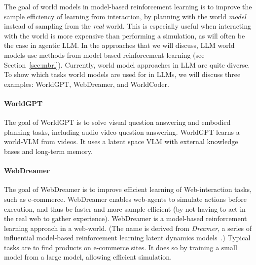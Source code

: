 The goal of world models in model-based reinforcement learning is to improve the sample efficiency of learning from interaction, by planning with the world {\em model} instead of sampling from the {\em real} world. This is especially useful when interacting with the world is more expensive than performing a simulation, as will often be the case in agentic LLM. In the approaches that we will discuss, LLM world models  use methods from model-based reinforcement learning (see Section~\ref{sec:mbrl}). Currently, world model approaches in LLM are  quite diverse. To show which tasks world models are used for in LLMs, we will discuss three examples: WorldGPT, WebDreamer, and WorldCoder. 

\paragraph{WorldGPT}
The goal of 
WorldGPT \citep{ge2024worldgpt} is to solve visual question answering and embodied planning tasks, including audio-video question answering. WorldGPT learns a world-VLM from videos.
It uses a  latent space VLM with external knowledge bases and long-term memory. 

\paragraph{WebDreamer}
The goal of WebDreamer \citep{gu2024your} is to improve efficient learning of Web-interaction tasks, such as e-commerce. WebDreamer enables web-agents to simulate actions before execution, and thus be faster and more sample efficient (by not having to act in the real web to gather experience). WebDreamer is a model-based reinforcement learning approach in a web-world. (The name is derived from {\em Dreamer}, a series of influential model-based reinforcement learning latent dynamics models~\citep{hafner2018learning,hafner2019dream,hafner2023mastering}.) Typical tasks are to find products on e-commerce sites. It does so by training a small model from a large model, allowing efficient simulation.


